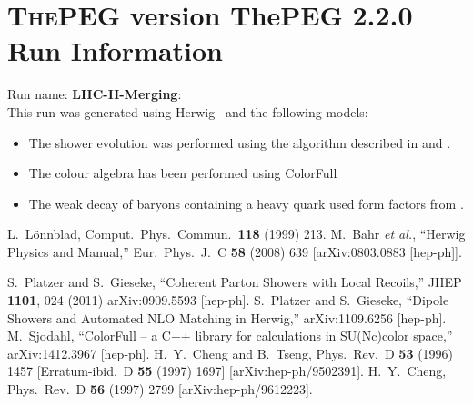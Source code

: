 \documentclass{article}
\begin{document}
\appendix
\section[xxx]{\textsc{ThePEG} version ThePEG 2.2.0 \cite{ThePEG} Run Information}
Run name: \textbf{LHC-H-Merging}:\\
This run was generated using Herwig~\cite{Bahr:2008pv} and the following models:
\begin{itemize}
\item The shower evolution was performed using the algorithm described in \cite{Platzer:2009jq} and \cite{Platzer:2011bc}.
\item The colour algebra has been performed using ColorFull \cite{Sjodahl:2014opa}
\item The weak decay of baryons containing a heavy quark used form factors from \cite{Cheng:1995fe,Cheng:1996cs}.
\end{itemize}

\begin{thebibliography}{99}
 L.~L\"onnblad, Comput.~Phys.~Commun.\ {\bf 118} (1999) 213.
  M.~Bahr {\it et al.},
  ``Herwig Physics and Manual,''
  Eur.\ Phys.\ J.\  C {\bf 58} (2008) 639
  [arXiv:0803.0883 [hep-ph]].

S.~Platzer and S.~Gieseke,
``Coherent Parton Showers with Local Recoils,''
  JHEP {\bf 1101}, 024 (2011)
arXiv:0909.5593 [hep-ph].
S.~Platzer and S.~Gieseke,
``Dipole Showers and Automated NLO Matching in Herwig,''
arXiv:1109.6256 [hep-ph].
M.~Sjodahl,
``ColorFull -- a C++ library for calculations in SU(Nc)color space,''
arXiv:1412.3967 [hep-ph].
  H.~Y.~Cheng and B.~Tseng,
  Phys.\ Rev.\  D {\bf 53} (1996) 1457
  [Erratum-ibid.\  D {\bf 55} (1997) 1697]
  [arXiv:hep-ph/9502391].
  H.~Y.~Cheng,
  Phys.\ Rev.\  D {\bf 56} (1997) 2799
  [arXiv:hep-ph/9612223].

\end{thebibliography}
\end{document}
